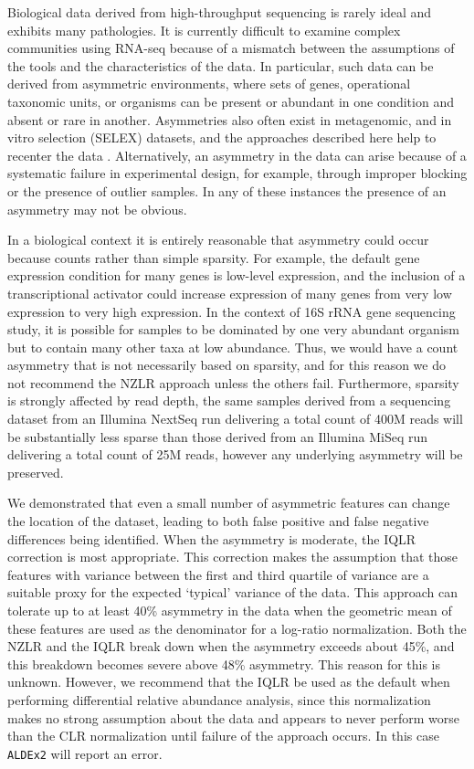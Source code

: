 \documentclass[graybox]{svmult}
\begin{document}
Biological data derived from high-throughput sequencing is rarely ideal and exhibits many pathologies. It is currently difficult to examine complex communities using RNA-seq because of a mismatch between the assumptions of the tools and the characteristics of the data. In particular, such data can be derived from asymmetric environments, where sets of genes, operational taxonomic units, or organisms can be present or abundant in one condition and absent or rare in another. Asymmetries also often exist in metagenomic, and in vitro selection (SELEX) datasets, and the approaches described here help to recenter the data  \cite{Almeida:2019aa,McMurrough:2018aa,Wolfs:2016aa}.  Alternatively, an asymmetry in the data can arise because of a systematic failure in experimental design, for example, through improper blocking or the presence of outlier samples. In any of these instances the presence of an asymmetry may not be obvious. 

In a biological context it is entirely reasonable that asymmetry could occur because counts  rather than simple sparsity. For example, the default gene expression condition for many genes is low-level expression, and the inclusion of a transcriptional activator could increase expression of many genes from very low expression to very high expression. In the context of 16S rRNA gene sequencing study, it is possible for samples to be dominated by one very abundant organism but to contain many other taxa at low abundance. Thus, we would have a count asymmetry that is not necessarily based on sparsity, and for this reason we do not recommend the NZLR approach unless the others fail. Furthermore, sparsity is strongly affected by read depth, the same samples derived from a sequencing dataset from an Illumina NextSeq run delivering a total count of 400M reads will be substantially less sparse than those derived from an Illumina MiSeq run delivering a total count of 25M reads, however any underlying asymmetry will be preserved.

We demonstrated that even a small number of asymmetric features can change the location of the dataset, leading to both false positive and false negative differences being identified. When the asymmetry is moderate, the IQLR correction is most appropriate. This correction makes the assumption that those features with variance between the first and third quartile of variance are a suitable proxy for the expected `typical' variance of the data. This approach can tolerate up to at least 40\% asymmetry in the data when the geometric mean of these features are used as the denominator for a log-ratio normalization. Both the NZLR and the IQLR break down when the asymmetry exceeds about 45\%, and this breakdown becomes severe above 48\% asymmetry. This reason for this is unknown. However, we recommend that the IQLR be used as the default when performing differential relative abundance analysis, since this normalization makes no strong assumption about the data and appears to never perform worse than the CLR normalization until failure of the approach occurs. In this case \texttt{ALDEx2} will report an error.
\end{document}
